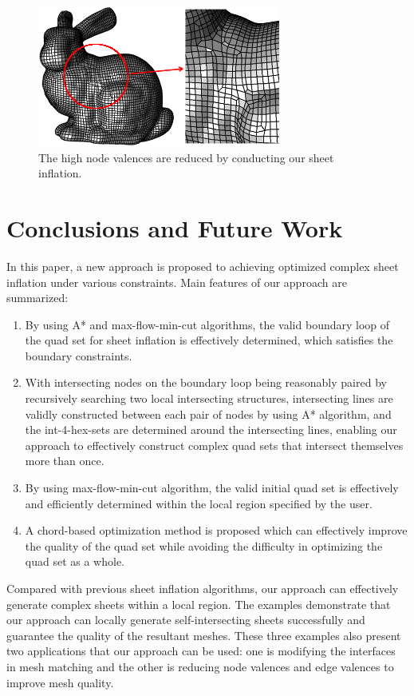 \documentclass[final,5p,times,twocolumn]{elsarticle}
\begin{document}
\begin{figure}[htbp]
\begin{center}
\includegraphics[width=8cm]{rev_figures/bunny_result.png}
\caption{The high node valences are reduced by conducting our sheet inflation.}
\label{fig:bunny_result}
\end{center}
\end{figure}
\section{Conclusions and Future Work}
In this paper, a new approach is proposed to achieving optimized complex sheet inflation under various constraints. Main features of our approach are summarized:

\begin{enumerate}
  \item By using A* and max-flow-min-cut algorithms, the valid boundary loop of the quad set for sheet inflation is effectively determined, which satisfies the boundary constraints.
  \item With intersecting nodes on the boundary loop being reasonably paired by recursively searching two local intersecting structures, intersecting lines are validly constructed between each pair of nodes by using A* algorithm, and the int-4-hex-sets are determined around the intersecting lines, enabling our approach to effectively construct complex quad sets that intersect themselves more than once.
  \item By using max-flow-min-cut algorithm, the valid initial quad set is effectively and efficiently determined within the local region specified by the user.
  \item A chord-based optimization method is proposed which can effectively improve the quality of the quad set while avoiding the difficulty in optimizing the quad set as a whole.
\end{enumerate}

Compared with previous sheet inflation algorithms, our approach can effectively generate complex sheets within a local region. The examples demonstrate that our approach can locally generate self-intersecting sheets successfully and guarantee the quality of the resultant meshes. These three examples also present two applications that our approach can be used: one is modifying the interfaces in mesh matching and the other is reducing node valences and edge valences to improve mesh quality.
\end{document}
